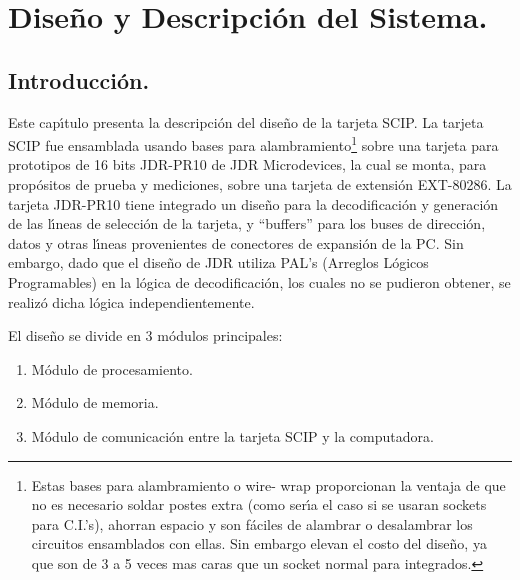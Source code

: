 \chapter[Dise\~no y Descripci\'on del Sistema.]{Dise\~no y Descripci\'on del Sistema.}
\label{Capitulo:diseno}


\fancyhead[LE,RO]{\thepage}


\section{Introducci\'on.}
\label{Seccion:IntroCap3}

Este cap\'{\i}tulo presenta la descripci\'on del dise\~no de la tarjeta SCIP. La tarjeta SCIP %
fue ensamblada usando bases para alambramiento\footnote{Estas bases para alambramiento o wire-%
wrap proporcionan la ventaja de que no es necesario soldar postes extra (como ser\'{\i}a el %
caso si se usaran sockets para C.I.'s), ahorran espacio y son f\'aciles de alambrar o %
desalambrar los circuitos ensamblados con ellas. Sin embargo elevan el costo del dise\~no, ya %
que son de 3 a 5 veces mas caras que un socket normal para integrados.} sobre una tarjeta para %
prototipos de 16 bits JDR-PR10 de JDR Microdevices, la cual se monta, para prop\'ositos de %
prueba y mediciones, sobre una tarjeta de extensi\'on EXT-80286. La tarjeta JDR-PR10 tiene %
integrado un dise\~no para la decodificaci\'on y generaci\'on de las l\'{\i}neas de %
selecci\'on de la tarjeta, y ``buffers'' para los buses de direcci\'on, datos y otras %
l\'{\i}neas provenientes de conectores de expansi\'on de la PC. Sin embargo, dado que el %
dise\~no de JDR utiliza PAL's (Arreglos L\'ogicos Programables) en la l\'ogica de %
decodificaci\'on, los cuales no se pudieron obtener, se realiz\'o dicha l\'ogica %
independientemente.

El dise\~no se divide en 3 m\'odulos principales:

\begin{enumerate}
\item M\'odulo de procesamiento.
\item M\'odulo de memoria.
\item M\'odulo de comunicaci\'on entre la tarjeta SCIP y la computadora.
\end{enumerate}

